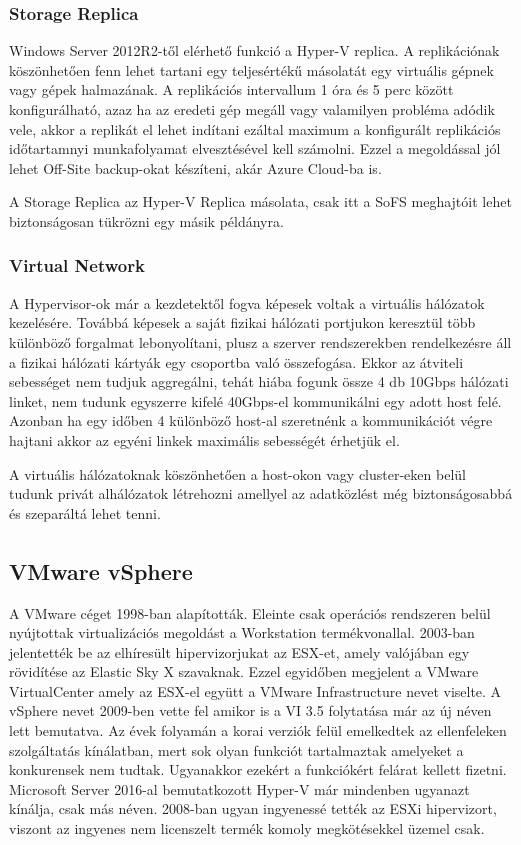 \documentclass[12pt,oneside,justify,table]{book}
\begin{document}
\subsubsection{Storage Replica}

Windows Server 2012R2-től elérhető funkció a Hyper-V replica. A replikációnak köszönhetően fenn lehet tartani egy teljesértékű másolatát egy virtuális gépnek vagy gépek halmazának. A replikációs intervallum 1 óra és 5 perc között konfigurálható, azaz ha az eredeti gép megáll vagy valamilyen probléma adódik vele, akkor a replikát el lehet indítani ezáltal maximum a konfigurált replikációs időtartamnyi munkafolyamat elvesztésével kell számolni. Ezzel a megoldással jól lehet Off-Site backup-okat készíteni, akár Azure Cloud-ba is.

A Storage Replica az Hyper-V Replica másolata, csak itt a SoFS meghajtóit lehet biztonságosan tükrözni egy másik példányra.

\subsubsection{Virtual Network}

A Hypervisor-ok már a kezdetektől fogva képesek voltak a virtuális hálózatok kezelésére. Továbbá képesek a saját fizikai hálózati portjukon keresztül több különböző forgalmat lebonyolítani, plusz a szerver rendszerekben rendelkezésre áll a fizikai hálózati kártyák egy csoportba való összefogása. Ekkor az átviteli sebességet nem tudjuk aggregálni, tehát hiába fogunk össze 4 db 10Gbps hálózati linket, nem tudunk egyszerre kifelé 40Gbps-el kommunikálni egy adott host felé. Azonban ha egy időben 4 különböző host-al szeretnénk a kommunikációt végre hajtani akkor az egyéni linkek maximális sebességét érhetjük el. 

A virtuális hálózatoknak köszönhetően a host-okon vagy cluster-eken belül tudunk privát alhálózatok létrehozni amellyel az adatközlést még biztonságosabbá és szeparáltá lehet tenni.

\subsection{VMware vSphere\textsuperscript{\textregistered}}
A VMware céget 1998-ban alapították. Eleinte csak operációs rendszeren belül nyújtottak virtualizációs megoldást a Workstation  termékvonallal. 2003-ban jelentették be az elhíresült hipervizorjukat az ESX-et, amely valójában egy rövidítése az Elastic Sky X szavaknak. Ezzel egyidőben megjelent a VMware VirtualCenter amely az ESX-el együtt a VMware Infrastructure nevet viselte. A vSphere nevet 2009-ben vette fel amikor is a VI 3.5 folytatása már az új néven lett bemutatva. Az évek folyamán a korai verziók felül emelkedtek az ellenfeleken szolgáltatás kínálatban, mert sok olyan funkciót tartalmaztak amelyeket a konkurensek nem tudtak. Ugyanakkor ezekért a funkciókért felárat kellett fizetni. Microsoft Server 2016-al bemutatkozott Hyper-V már mindenben ugyanazt kínálja, csak más néven. 2008-ban ugyan ingyenessé tették az ESXi hipervizort, viszont az ingyenes nem licenszelt termék komoly megkötésekkel üzemel csak.  \\
\end{document}

